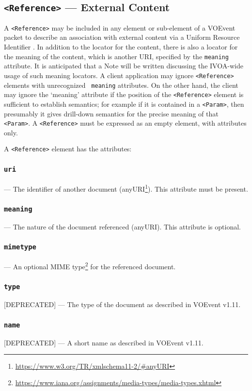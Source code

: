 \documentclass[11pt,a4paper]{ivoa}
\begin{document}
\subsection{{\tt <Reference>} --- External Content}
\label{sec:3.9}
A {\tt <Reference>} may be included in any element or sub-element of a VOEvent
packet to describe an association with external content via a Uniform Resource
Identifier \citep{2016ivoa.spec.0523D}. In addition to the locator for the
content, there is also a locator for the meaning of the content, which is
another URI, specified by the {\tt meaning} attribute. It is anticipated that a
Note will be written discussing the IVOA-wide usage of such meaning locators. A
client application may ignore {\tt <Reference>} elements with unrecognized {\tt
meaning} attributes. On the other hand, the client may ignore the `meaning'
attribute if the position of the {\tt <Reference>} element is sufficient to
establish semantics; for example if it is contained in a {\tt <Param>}, then
presumably it gives drill-down semantics for the precise meaning of that {\tt
<Param>}. A {\tt <Reference>} must be expressed as an empty element, with
attributes only.

A {\tt <Reference>} element has the attributes:
\subsubsection{\tt uri}\label{sec:3.9.1}--- The identifier of another document
(anyURI\footnote{\url{https://www.w3.org/TR/xmlschema11-2/\#anyURI}}). This
attribute must be present.
\subsubsection{\tt meaning}\label{sec:3.9.2}--- The nature of the document
referenced (anyURI). This attribute is optional.
\subsubsection{\tt mimetype}\label{sec:3.9.3}--- An optional MIME type\footnote{
\url{https://www.iana.org/assignments/media-types/media-types.xhtml}} for the
referenced document.
\subsubsection{\tt type}\label{sec:3.9.4}[DEPRECATED] --- The type of the
document as described in VOEvent v1.11.
\subsubsection{\tt name}\label{sec:3.9.5}[DEPRECATED] --- A short name as
described in VOEvent v1.11.
\end{document}

